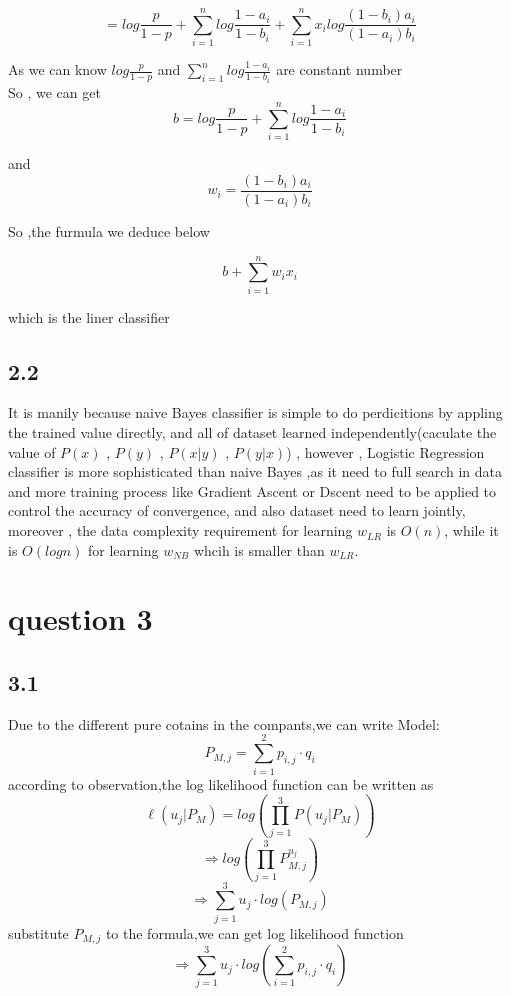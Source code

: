 \documentclass[a4paper,12pt]{article}
\begin{document}
$$=log\frac{p}{1-p}+\sum\limits_{i=1}^nlog\frac{1-a_i}{1-b_i} + \sum\limits_{i=1}^nx_ilog\frac{(1-b_i)a_i}{(1-a_i)b_i} $$

As we can know $log\frac{p}{1-p}$ and $\sum\limits_{i=1}^nlog\frac{1-a_i}{1-b_i}$ are constant number\\

So , we can get 
$$b = log\frac{p}{1-p} + \sum\limits_{i=1}^nlog\frac{1-a_i}{1-b_i} $$

and
$$w_i = \frac{(1-b_i)a_i}{(1-a_i)b_i} $$

So ,the furmula we deduce below 

$$b + \sum\limits_{i=1}^n w_i x_i $$

which is the liner classifier\\


\newpage
\subsection*{2.2}
It is manily because naive Bayes classifier is simple to do perdicitions by appling the trained value directly, and all of dataset learned independently(caculate the value of $P(x)$ , $P(y)$  , $P(x|y)$ , $ P(y|x)$) , however , Logistic Regression classifier is more sophisticated than naive Bayes ,as it need to full search in data and more training process like Gradient Ascent or Dscent need to be applied to control the accuracy of convergence, and also dataset need to learn jointly, moreover , the data complexity requirement for learning $w_{LR}$ is $O(n)$, while it is $O(log⁡n)$ for learning $w_{NB}$ whcih is smaller than $w_{LR}$.


\section*{question 3}
\subsection*{3.1}
Due to the different pure cotains in the compants,we can write Model:
$$P_{M,j}=\sum\limits_{i=1}^{2}p_{i,j} \cdot q_i $$
according to observation,the log likelihood function can be written as 
$$\ell(u_j|P_M)=log(\prod\limits_{j=1}^3P(u_j|P_M))$$
$$\Longrightarrow log(\prod_{j=1}^{3} P_{M,j}^{u_j} )$$
$$\Longrightarrow \sum\limits_{j=1}^{3}u_j \cdot log(P_{M,j}) $$
substitute $P_{M,j}$ to the formula,we can get log likelihood function
$$\Longrightarrow \sum\limits_{j=1}^{3}u_j \cdot log(\sum\limits_{i=1}^{2}p_{i,j} \cdot q_i) $$
\end{document}
